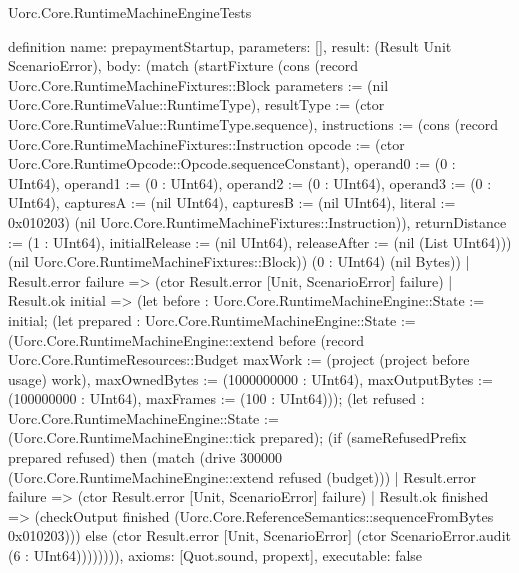 \begin{lexlean}{Uorc.Core.RuntimeMachineEngineTests}
\begin{semanticmodule}
definition{
  name: prepaymentStartup,
  parameters: [],
  result: (Result Unit ScenarioError),
  body: (match (startFixture (cons (record Uorc.Core.RuntimeMachineFixtures::Block {parameters := (nil Uorc.Core.RuntimeValue::RuntimeType), resultType := (ctor Uorc.Core.RuntimeValue::RuntimeType.sequence), instructions := (cons (record Uorc.Core.RuntimeMachineFixtures::Instruction {opcode := (ctor Uorc.Core.RuntimeOpcode::Opcode.sequenceConstant), operand0 := (0 : UInt64), operand1 := (0 : UInt64), operand2 := (0 : UInt64), operand3 := (0 : UInt64), capturesA := (nil UInt64), capturesB := (nil UInt64), literal := 0x010203}) (nil Uorc.Core.RuntimeMachineFixtures::Instruction)), returnDistance := (1 : UInt64), initialRelease := (nil UInt64), releaseAfter := (nil (List UInt64))}) (nil Uorc.Core.RuntimeMachineFixtures::Block)) (0 : UInt64) (nil Bytes))
    | Result.error failure => (ctor Result.error [Unit, ScenarioError] failure)
    | Result.ok initial => (let before : Uorc.Core.RuntimeMachineEngine::State := initial; (let prepared : Uorc.Core.RuntimeMachineEngine::State := (Uorc.Core.RuntimeMachineEngine::extend before (record Uorc.Core.RuntimeResources::Budget {maxWork := (project (project before usage) work), maxOwnedBytes := (1000000000 : UInt64), maxOutputBytes := (100000000 : UInt64), maxFrames := (100 : UInt64)})); (let refused : Uorc.Core.RuntimeMachineEngine::State := (Uorc.Core.RuntimeMachineEngine::tick prepared); (if (sameRefusedPrefix prepared refused) then (match (drive 300000 (Uorc.Core.RuntimeMachineEngine::extend refused (budget)))
      | Result.error failure => (ctor Result.error [Unit, ScenarioError] failure)
      | Result.ok finished => (checkOutput finished (Uorc.Core.ReferenceSemantics::sequenceFromBytes 0x010203))) else (ctor Result.error [Unit, ScenarioError] (ctor ScenarioError.audit (6 : UInt64)))))))),
  axioms: [Quot.sound, propext],
  executable: false
}


\end{semanticmodule}
\end{lexlean}
